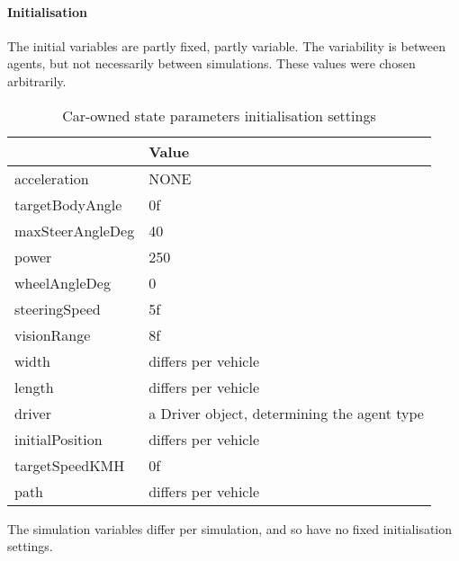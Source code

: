 \paragraph{Initialisation}
\label{par:method:model:details:initialization}

The initial variables are partly fixed, partly variable. The variability is between agents, but not necessarily between simulations. These values were chosen arbitrarily.

\begin{table}[H]
	\centering
	\begin{tabular}{ >{\ttfamily}l  p{10.5cm} }
		\toprule
		\normalfont{Parameter}	& Value \\  
		\midrule
		acceleration 			& NONE \\ 
		targetBodyAngle 		& 0f \\ 
		maxSteerAngleDeg 		& 40 \\ 
		power 					& 250 \\ 
		wheelAngleDeg 			& 0 \\ 
		steeringSpeed 			& 5f \\ 
		visionRange 			& 8f \\ 
		width 					& differs per vehicle \\ 
		length 					& differs per vehicle \\ 
		driver 					& a Driver object, determining the agent type \\ 
		initialPosition 		& differs per vehicle \\ 
		targetSpeedKMH			& 0f \\ 
		path					& differs per vehicle \\ 
		\bottomrule
	\end{tabular}
	\caption{Car-owned state parameters initialisation settings}
	\label{tab:par:method:model:details:init:car:value}
\end{table} 

The simulation variables differ per simulation, and so have no fixed initialisation settings.


